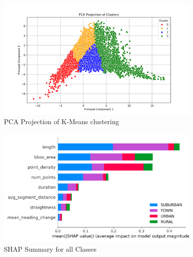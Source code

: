 \documentclass[a4paper,12pt,twoside]{scrreprt}
\begin{document}
\begin{figure}[htbp]
  \centering

  \includegraphics[width=0.9\textwidth]{Figures/kmeans_diagram_feature_data.png}
  \caption{PCA Projection of K-Means clustering}
  \label{fig:pca_kmeans}
\end{figure}
\FloatBarrier

\begin{figure}[htbp]
  \centering

  \includegraphics[width=0.9\textwidth]{Figures/classifier/shap_summary_for_all_classes.png}
  \caption{SHAP Summary for all Classes}
  \label{fig:shap_all_classes}
\end{figure}
\end{document}

